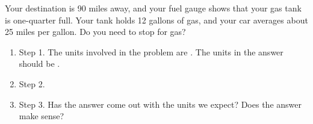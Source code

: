 Your destination is 90 miles away, and your fuel gauge shows that your gas tank is one-quarter full. Your tank holds 12 gallons of gas, and your car averages about 25 miles per gallon. Do you need to stop for gas?

\begin{enumerate}
\item Step 1. The units involved in the problem are \underline{\hspace{1in}}. The units in the answer should be \underline{\hspace{1in}}.

\item Step 2.
\vspace{1in}

\item Step 3. Has the answer come out with the units we expect?  Does the answer make sense?
\vspace{1in}
\end{enumerate}
\vspace{2in}
